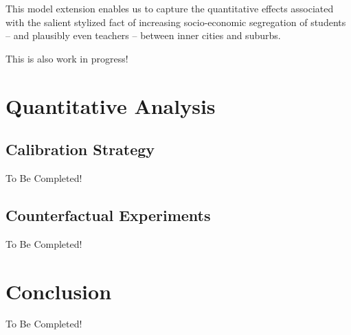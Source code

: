 \documentclass[onehalfspacing,11pt]{article}
\begin{document}
This model extension enables us to capture the quantitative effects associated with the salient stylized fact of increasing socio-economic segregation of students -- and plausibly even teachers -- between inner cities and suburbs.

{\sc This is also work in progress!}
\section{Quantitative Analysis}\label{sec:quant}
\subsection{Calibration Strategy}
{\sc To Be Completed!}
\subsection{Counterfactual Experiments}
{\sc To Be Completed!}
\section{Conclusion}\label{sec:conclusion}
{\sc To Be Completed!}
\newpage


\end{document}
